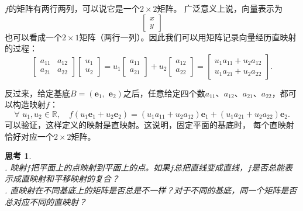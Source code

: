 \documentclass[12pt,UTF8]{ctexbook}
\newtheorem{sk}{思考}[section]
\begin{document}
$f$的矩阵有两行两列，可以说它是一个$2\times 2$矩阵。
广泛意义上说，向量表示为
$$ \begin{bmatrix}
    x\\ y
\end{bmatrix}$$
也可以看成一个$2\times 1$矩阵（两行一列）。因此我们可以用矩阵记录向量经历直映射的过程：
$$ \begin{bmatrix}
    a_{11} & a_{12} \\ a_{21} & a_{22}
\end{bmatrix}\begin{bmatrix}
    u_1\\ u_2
\end{bmatrix} = u_1\begin{bmatrix}
    a_{11}\\ a_{21}
\end{bmatrix} + u_2 \begin{bmatrix}
    a_{12}\\ a_{22}
\end{bmatrix} = \begin{bmatrix}
    u_1a_{11} + u_2a_{12}\\ u_1a_{21} + u_2a_{22} 
\end{bmatrix}.$$

反过来，给定基底$B = (\mathbf{e}_1, \,\,\mathbf{e}_2)$之后，任意给定四个数$a_{11}$、$a_{12}$、$a_{21}$、$a_{22}$，都可以构造映射$f$：
$$ \forall \,\, u_1, u_2 \in \mathbb{R}, \quad  f(u_1\mathbf{e}_1 + u_2\mathbf{e}_2) = (u_1a_{11} + u_2a_{12}) \mathbf{e}_1 + (u_1a_{21} + u_2a_{22}) \mathbf{e}_2.$$
可以验证，这样定义的映射是直映射。这说明，固定平面的基底时，
每个直映射恰好对应一个$2\times 2$矩阵。

\begin{sk}
    \mbox{} \\
    . 映射$f$把平面上的点映射到平面上的点。如果$f$总把直线变成直线，$f$是否总能表示成直映射和平移映射的复合？\\
    . 直映射在不同基底上的矩阵是否总是不一样？对于不同的基底，同一个矩阵是否总对应不同的直映射？
\end{sk}
\end{document}
